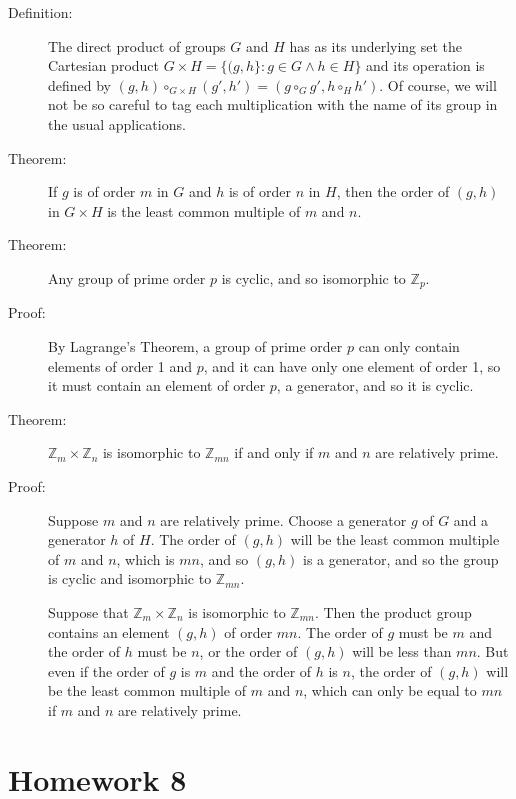\documentclass[12pt]{article}
\begin{document}
\begin{description}
\item[Definition:]  The direct product of groups $G$ and $H$ has as its underlying set the Cartesian product $G \times H = \{(g,h\}:g \in G \wedge h \in H\}$ and its operation is
defined by $(g,h) \circ_{G \times H} (g',h') = (g \circ_G g',h \circ_H h')$.  Of course, we will not be so careful to tag each multiplication with the name of its group in the usual applications.

\item[Theorem:]  If $g$ is of order $m$ in $G$ and $h$ is of order $n$ in $H$, then the order of $(g,h)$ in $G \times H$ is the least common multiple of $m$ and $n$.

\item[Theorem:]  Any group of prime order $p$ is cyclic, and so isomorphic to ${\mathbb Z}_p$.

\item[Proof:]  By Lagrange's Theorem, a group of prime order $p$ can only contain elements of order 1 and $p$, and it can have only one element of order 1,
so it must contain an element of order $p$, a generator, and so it is cyclic.

\item[Theorem:]  ${\mathbb Z}_m \times {\mathbb Z}_n$ is isomorphic to ${\mathbb Z}_{mn}$ if and only if $m$ and $n$ are relatively prime.

\item[Proof:]  Suppose $m$ and $n$ are relatively prime. Choose a generator $g$ of $G$ and a generator $h$ of $H$.  The order of $(g,h)$ will be the least common multiple of $m$ and $n$,
which is $mn$, and so $(g,h)$ is a generator, and so the group is cyclic and isomorphic to ${\mathbb Z}_{mn}$.

Suppose that ${\mathbb Z}_m \times {\mathbb Z}_n$ is isomorphic to ${\mathbb Z}_{mn}$.  Then the product group contains an element $(g,h)$ of order $mn$.  The order of $g$ must be $m$
and the order of $h$ must be $n$, or the order of $(g,h)$ will be less than $mn$.  But even if the order of $g$ is $m$ and the order of $h$ is $n$, the order of $(g,h)$ will be the least common multiple of $m$ and $n$, which can only be equal to $mn$ if $m$ and $n$ are
relatively prime.

\end{description}

\section{Homework 8}
\end{document}
